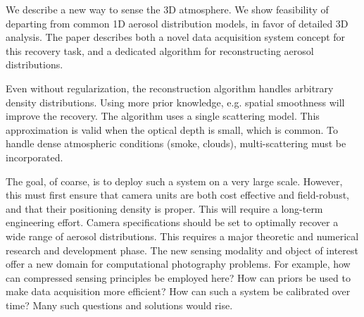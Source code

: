 \documentclass[10pt,twocolumn,letterpaper]{article}
\begin{document}
We describe a new way to sense the 3D atmosphere. We show feasibility
of departing from common 1D aerosol distribution models, in favor of
detailed 3D analysis.  The paper describes both a novel data
acquisition system concept for this recovery task, and a dedicated
algorithm for reconstructing aerosol distributions.

Even without regularization, the reconstruction algorithm handles
arbitrary density distributions. Using more prior knowledge,
e.g. spatial smoothness will improve the recovery.  The algorithm uses
a single scattering model. This approximation is valid when the
optical depth is small, which is common. To handle dense atmospheric
conditions (smoke, clouds), multi-scattering must be incorporated.

The goal, of coarse, is to deploy such a system on a very large
scale. However, this must first ensure that camera units are both cost
effective and field-robust, and that their positioning density is
proper. This will require a long-term engineering effort. Camera
specifications should be set to optimally recover a wide range of
aerosol distributions. This requires a major theoretic and numerical
research and development phase.  The new sensing modality and object
of interest offer a new domain for computational photography
problems. For example, how can compressed sensing principles be
employed here? How can priors be used to make data acquisition more
efficient? How can such a system be calibrated over time? Many such
questions and solutions would rise.




\end{document}
